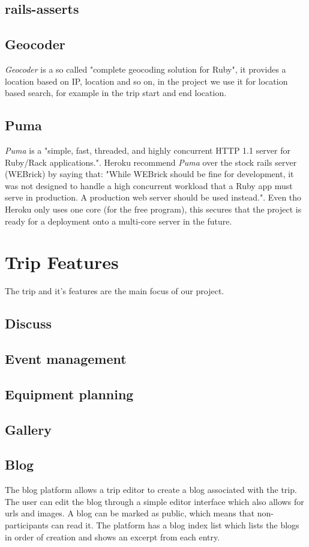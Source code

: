 \documentclass[a4paper]{article}
\begin{document}
\subsection{rails-asserts}

\subsection{Geocoder}
\textit{Geocoder} is a so called "complete geocoding solution for Ruby"\cite{geocoder}, it provides a location based on IP, location and so on, in the project we use it for location based search, for example in the trip start and end location. 

\subsection{Puma}
\textit{Puma} is a "simple, fast, threaded, and highly concurrent HTTP 1.1 server for Ruby/Rack applications."\cite{puma}. Heroku recommend \textit{Puma} over the stock rails server (WEBrick) by saying that: "While WEBrick should be fine for development, it was not designed to handle a high concurrent workload that a Ruby app must serve in production. A production web server should be used instead."\cite{heroku_webserver}. Even tho Heroku only uses one core (for the free program), this secures that the project is ready for a deployment onto a multi-core server in the future.  


\section{Trip Features}
The trip and it's features are the main focus of our project. 
\subsection{Discuss}
\subsection{Event management}
\subsection{Equipment planning}
\subsection{Gallery}
\subsection{Blog}
The blog platform allows a trip editor to create a blog associated with the trip. The user can edit the blog through a simple editor interface which also allows for urls and images. A blog can be marked as public, which means that non-participants can read it. The platform has a blog index list which lists the blogs in order of creation and shows an excerpt from each entry.
\end{document}
